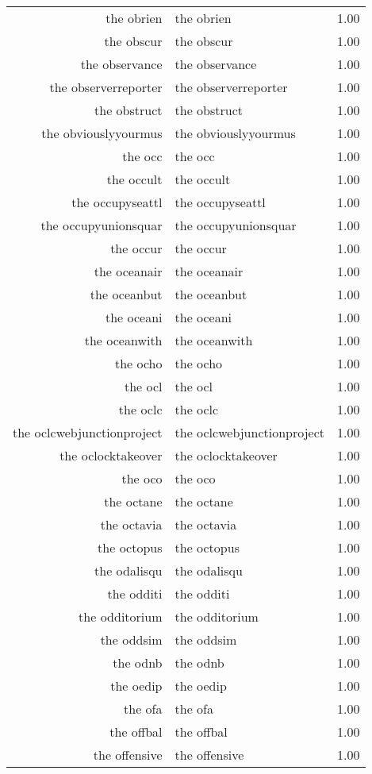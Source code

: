 \begin{table}[ht]
\begin{tabular}{rlr}
  the obrien & the obrien & 1.00 \\ 
  the obscur & the obscur & 1.00 \\ 
  the observance & the observance & 1.00 \\ 
  the observerreporter & the observerreporter & 1.00 \\ 
  the obstruct & the obstruct & 1.00 \\ 
  the obviouslyyourmus & the obviouslyyourmus & 1.00 \\ 
  the occ & the occ & 1.00 \\ 
  the occult & the occult & 1.00 \\ 
  the occupyseattl & the occupyseattl & 1.00 \\ 
  the occupyunionsquar & the occupyunionsquar & 1.00 \\ 
  the occur & the occur & 1.00 \\ 
  the oceanair & the oceanair & 1.00 \\ 
  the oceanbut & the oceanbut & 1.00 \\ 
  the oceani & the oceani & 1.00 \\ 
  the oceanwith & the oceanwith & 1.00 \\ 
  the ocho & the ocho & 1.00 \\ 
  the ocl & the ocl & 1.00 \\ 
  the oclc & the oclc & 1.00 \\ 
  the oclcwebjunctionproject & the oclcwebjunctionproject & 1.00 \\ 
  the oclocktakeover & the oclocktakeover & 1.00 \\ 
  the oco & the oco & 1.00 \\ 
  the octane & the octane & 1.00 \\ 
  the octavia & the octavia & 1.00 \\ 
  the octopus & the octopus & 1.00 \\ 
  the odalisqu & the odalisqu & 1.00 \\ 
  the odditi & the odditi & 1.00 \\ 
  the odditorium & the odditorium & 1.00 \\ 
  the oddsim & the oddsim & 1.00 \\ 
  the odnb & the odnb & 1.00 \\ 
  the oedip & the oedip & 1.00 \\ 
  the ofa & the ofa & 1.00 \\ 
  the offbal & the offbal & 1.00 \\ 
  the offensive & the offensive & 1.00 \\ 

\end{tabular}
\end{table}
